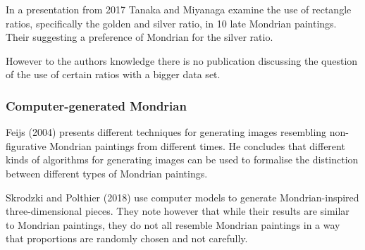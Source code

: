 In a presentation from 2017 Tanaka and Miyanaga \cite{Tanaka2017} examine the use
of rectangle ratios, specifically the golden and silver ratio, in 10 late
Mondrian paintings. Their suggesting a preference of Mondrian for the silver
ratio.

However to the authors knowledge there is no publication discussing the question of
the use of certain ratios with a bigger data set.

\subsubsection{Computer-generated Mondrian}



Feijs (2004)\cite{Feijs2004} presents different techniques for generating images
resembling non-figurative Mondrian paintings from different times. He  concludes
that different kinds of algorithms for generating images can be used to
formalise the distinction between different types of Mondrian paintings.


Skrodzki and Polthier (2018) \cite{Skrodzki2018} use computer models to generate
Mondrian-inspired three-dimensional pieces. They note however that while their
results are similar to Mondrian paintings, they do not all resemble Mondrian
paintings in a way that proportions are randomly chosen and not carefully.

